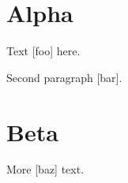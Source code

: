 \documentclass{article}
\newcommand*{\ai}[1]{[#1]}
\begin{document}
\tableofcontents
\section{Alpha}
Text \ai{foo} here.

Second paragraph \ai{bar}.
\section{Beta}
More \ai{baz} text.
\end{document}
